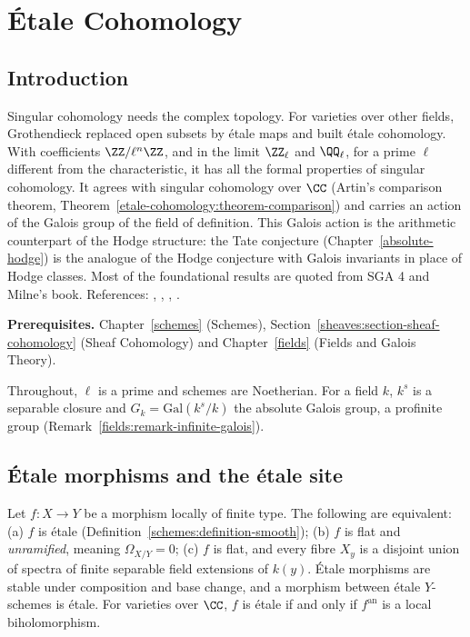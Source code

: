 \chapter{\'Etale Cohomology}\label{etale-cohomology}

\section{Introduction}\label{etale-cohomology:section-introduction}

Singular cohomology needs the complex topology. For varieties over other fields, Grothendieck replaced open subsets by \'etale maps and built \'etale cohomology.
With coefficients $\ZZ/\ell^n\ZZ$, and in the limit $\ZZ_\ell$ and $\QQ_\ell$, for a prime $\ell$ different from the characteristic, it has all the formal properties of singular
cohomology. It agrees with singular cohomology over $\CC$ (Artin's comparison theorem, Theorem~\ref{etale-cohomology:theorem-comparison}) and carries an action of the
Galois group of the field of definition. This Galois action is the arithmetic counterpart of the Hodge structure: the Tate conjecture (Chapter~\ref{absolute-hodge}) is the
analogue of the Hodge conjecture with Galois invariants in place of Hodge classes. Most of the foundational results are quoted from SGA 4 and Milne's book. References:
\cite{milne-etale}, \cite{sga4-1}, \cite{sga4-3}, \cite{sga4-half}.

\noindent\textbf{Prerequisites.} Chapter~\ref{schemes} (Schemes), Section~\ref{sheaves:section-sheaf-cohomology} (Sheaf Cohomology) and Chapter~\ref{fields} (Fields and Galois Theory).

Throughout, $\ell$ is a prime and schemes are Noetherian. For a field $k$, $k^s$ is a separable closure and $G_k = \mathrm{Gal}(k^s/k)$ the absolute Galois group, a profinite group
(Remark~\ref{fields:remark-infinite-galois}).

\section{\'Etale morphisms and the \'etale site}\label{etale-cohomology:section-etale-site}

\begin{proposition}\label{etale-cohomology:proposition-etale}
Let $f \colon X \to Y$ be a morphism locally of finite type. The following are equivalent: (a) $f$ is \'etale (Definition~\ref{schemes:definition-smooth}); (b) $f$ is flat and
\emph{unramified}, meaning $\Omega_{X/Y} = 0$; (c) $f$ is flat, and every fibre $X_y$ is a disjoint union of spectra of finite separable field extensions of $k(y)$. \'Etale morphisms are
stable under composition and base change, and a morphism between \'etale $Y$-schemes is \'etale. For varieties over $\CC$, $f$ is \'etale if and only if $f^{\mathrm{an}}$ is a local
biholomorphism.
\end{proposition}

